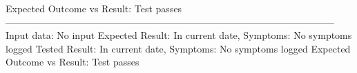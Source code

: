 \documentclass[letterpaper,12pt,titlepage]{article}
\begin{document}
\newline
\newline
Expected Outcome vs Result: Test passes
\newline
\newline
------------------------------------------------------------------------------------------------------
\newline
Input data: No input
\newline
\newline
Expected Result: In current date, Symptoms: No symptoms logged
\newline
\newline
Tested Result: In current date, Symptoms: No symptoms logged
\newline
\newline
Expected Outcome vs Result: Test passes
\newline
\newline
\end{document}

